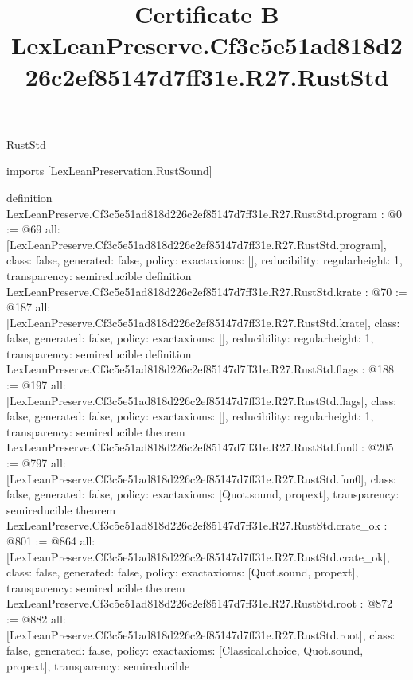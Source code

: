 \begin{lexlean}{RustStd}
\title{Certificate B LexLeanPreserve.Cf3c5e51ad818d226c2ef85147d7ff31e.R27.RustStd}
\begin{coremodule}
imports [LexLeanPreservation.RustSound]

definition LexLeanPreserve.Cf3c5e51ad818d226c2ef85147d7ff31e.R27.RustStd.program : @0 := @69 {
  all: [LexLeanPreserve.Cf3c5e51ad818d226c2ef85147d7ff31e.R27.RustStd.program],
  class: false,
  generated: false,
  policy: exact{axioms: []},
  reducibility: regular{height: 1},
  transparency: semireducible
}
definition LexLeanPreserve.Cf3c5e51ad818d226c2ef85147d7ff31e.R27.RustStd.krate : @70 := @187 {
  all: [LexLeanPreserve.Cf3c5e51ad818d226c2ef85147d7ff31e.R27.RustStd.krate],
  class: false,
  generated: false,
  policy: exact{axioms: []},
  reducibility: regular{height: 1},
  transparency: semireducible
}
definition LexLeanPreserve.Cf3c5e51ad818d226c2ef85147d7ff31e.R27.RustStd.flags : @188 := @197 {
  all: [LexLeanPreserve.Cf3c5e51ad818d226c2ef85147d7ff31e.R27.RustStd.flags],
  class: false,
  generated: false,
  policy: exact{axioms: []},
  reducibility: regular{height: 1},
  transparency: semireducible
}
theorem LexLeanPreserve.Cf3c5e51ad818d226c2ef85147d7ff31e.R27.RustStd.fun0 : @205 := @797 {
  all: [LexLeanPreserve.Cf3c5e51ad818d226c2ef85147d7ff31e.R27.RustStd.fun0],
  class: false,
  generated: false,
  policy: exact{axioms: [Quot.sound, propext]},
  transparency: semireducible
}
theorem LexLeanPreserve.Cf3c5e51ad818d226c2ef85147d7ff31e.R27.RustStd.crate_ok : @801 := @864 {
  all: [LexLeanPreserve.Cf3c5e51ad818d226c2ef85147d7ff31e.R27.RustStd.crate_ok],
  class: false,
  generated: false,
  policy: exact{axioms: [Quot.sound, propext]},
  transparency: semireducible
}
theorem LexLeanPreserve.Cf3c5e51ad818d226c2ef85147d7ff31e.R27.RustStd.root : @872 := @882 {
  all: [LexLeanPreserve.Cf3c5e51ad818d226c2ef85147d7ff31e.R27.RustStd.root],
  class: false,
  generated: false,
  policy: exact{axioms: [Classical.choice, Quot.sound, propext]},
  transparency: semireducible
}


\end{coremodule}
\end{lexlean}
